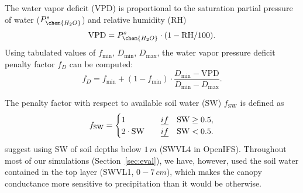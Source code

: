 \documentclass[gmd, manuscript]{copernicus}
\begin{document}
The water vapor deficit (VPD) is proportional to the saturation partial pressure of water ($P_\chem{H_2O}^s$) and relative humidity ($\text{RH}$)
%
\begin{equation}
  \text{VPD} = P_\chem{H_2O}^s \cdot (1 - \text{RH}/100).
\end{equation}
%
Using tabulated values of $f_\text{min}$, $D_\text{min}$, $D_\text{max}$, the water vapor pressure deficit penalty factor $f_D$ can be computed:
%
\begin{equation}
  f_D = f_\text{min}+(1-f_\text{min}) \cdot \frac{D_\text{min} - \text{VPD}}{D_\text{min}-D_\text{max}}.
\end{equation}

The penalty factor with respect to available soil water ($\text{SW}$) $f_\text{SW}$ is defined as 
%
\begin{equation}
  f_\text{SW} =
  \begin{cases}
    1 & \quad \emph{if} \quad \text{SW} \geq 0.5,\\
    2 \cdot \text{SW}  & \quad \emph{if} \quad \text{SW} < 0.5.
  \end{cases}
\end{equation}
\citet{ACP:Simpson2012} suggest using SW of soil depths below $1\,\unit{m}$ (SWVL4 in OpenIFS). Throughout most of our simulations (Section~\ref{sec:eval}), we have, however, used the soil water contained in the top layer (SWVL1, $0-7\,\unit{cm}$), which makes the canopy conductance more sensitive to precipitation than it would be otherwise.
\end{document}
